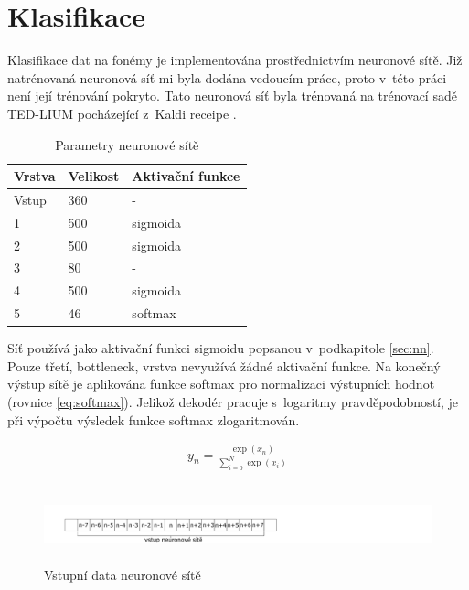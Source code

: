 \section{Klasifikace}\label{sec:imple_nn}
Klasifikace dat na fonémy je implementována prostřednictvím neuronové sítě. Již natrénovaná neuronová síť mi byla dodána vedoucím práce, proto v~této práci není její trénování pokryto. Tato neuronová síť byla trénovaná na trénovací sadě TED-LIUM pocházející z~Kaldi receipe \cite{Rousseau2014EnhancingTT}. 

\begin{table}[H]
\centering
\caption{Parametry neuronové sítě}
\label{tab:nn_params}
\begin{tabular}{|l|l|l|}
\hline
Vrstva & Velikost & Aktivační funkce \\ \hline
Vstup  & 360      & -                \\ \hline
1      & 500      & sigmoida         \\ \hline
2      & 500      & sigmoida         \\ \hline
3      & 80       & -                \\ \hline
4      & 500      & sigmoida         \\ \hline
5      & 46       & softmax          \\ \hline  
\end{tabular}
\end{table}

Síť používá jako aktivační funkci sigmoidu popsanou v~podkapitole \ref{sec:nn}. Pouze třetí, bottleneck, vrstva nevyužívá žádné aktivační funkce. Na konečný výstup sítě je aplikována funkce softmax pro normalizaci výstupních hodnot (rovnice \ref{eq:softmax}). Jelikož dekodér pracuje s~logaritmy pravděpodobností, je při výpočtu výsledek funkce softmax zlogaritmován.

\begin{equation} \label{eq:softmax}
\begin{gathered}
y_n = \frac{\exp(x_n)}{\sum^N_{i = 0}\exp(x_i)}
\end{gathered}
\end{equation}

\begin{figure}[H]
	\centering
		\includegraphics[height=2.2cm]{obrazky-figures/nn_input.pdf}
        \caption{Vstupní data neuronové sítě}
\end{figure}

